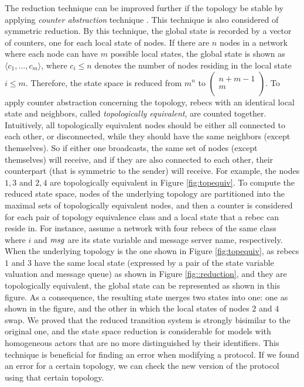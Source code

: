 The reduction technique can be improved further if the topology be stable %
by applying \emph{counter abstraction} technique \cite{emerson1999asymmetry}. This technique is also considered of symmetric reduction. By this technique, the global state is recorded by a vector of counters, one for each local state of nodes. If there are $n$ nodes in a network where each node can have $m$ possible local states, the global state is shown as $\langle c_1,\ldots,c_m \rangle $, where $c_i\le n$ denotes the number of nodes residing in the local state $i\le m$. Therefore, the state space is reduced from $m^n$ to $\begin{pmatrix}
n+m-1 \\
m \\
\end{pmatrix}$. To apply
counter abstraction concerning the topology, rebecs with an identical local state and
neighbors, called \textit{topologically equivalent},  are counted together. Intuitively, all topologically equivalent nodes should be either all connected to each other, or disconnected, while they should have the same neighbors (except themselves). So if either one broadcasts, the same set of nodes (except themselves) will receive, and if they are also connected to each other, their counterpart (that is symmetric to the sender) will receive. For example, the nodes $1,3$ and $2,4$ are topologically equivalent in Figure \ref{fig:topequiv}. To compute the reduced state space, nodes of the underlying topology are partitioned into the maximal sets of topologically equivalent nodes, and then a counter is considered for each pair of topology equivalence class and a local state that a rebec can reside in. For instance, assume a network with four rebecs of the same class where $i$ and ${\it msg}$ are its state variable and message server name, respectively. When the underlying topology is the one shown in Figure \ref{fig:topequiv}, as rebecs $1$ and $3$ have the same local state (expressed by a pair of the state variable valuation and message queue) as shown in Figure \ref{fig::reduction}, and they are topologically equivalent, the global state can be represented as shown in this figure. As a consequence, the resulting state merges two states into one: one as shown in the figure, and the other in which the local states of nodes $2$ and $4$ swap. We proved that the reduced transition system is strongly bisimilar to
the original one, and the state space reduction is considerable for models with homogeneous  actors that are no more distinguished by their identifiers. This technique is
beneficial for finding an error when modifying a protocol. If we found an error for a certain topology, %
we can check the new version of the protocol using that certain topology.


